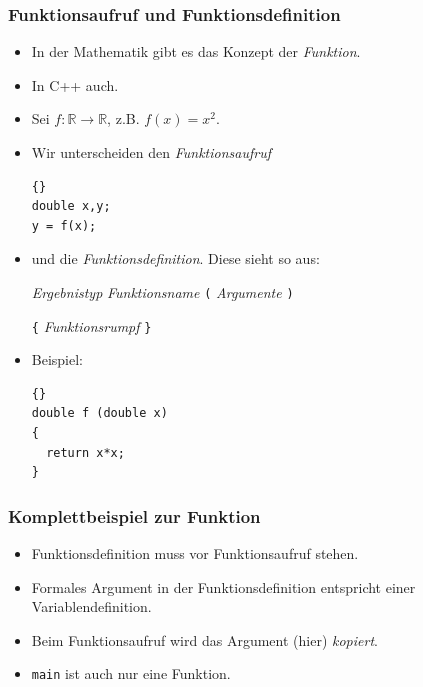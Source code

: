 \begin{frame}[fragile]
\frametitle{Funktionsaufruf und Funktionsdefinition}
\begin{itemize}
\item In der Mathematik gibt es das Konzept der \textsl{Funktion}.
\item In C++ auch.
\item Sei $f : \mathbb{R} \to \mathbb{R}$, z.B. $f(x) = x^2$.
\item Wir unterscheiden den \textsl{Funktionsaufruf}
{\scriptsize\begin{lstlisting}{}
double x,y;
y = f(x);
\end{lstlisting}}
\item und die \textsl{Funktionsdefinition}. Diese sieht so aus:

\medskip
\textsl{Ergebnistyp} \textsl{Funktionsname} \lstinline{(} \textsl{Argumente} \lstinline{)}

\lstinline!{! \textsl{Funktionsrumpf} \lstinline!}!

\medskip
\item Beispiel:
{\scriptsize\begin{lstlisting}{}
double f (double x)
{
  return x*x;
}
\end{lstlisting}}
\end{itemize}
\end{frame}

\begin{frame}[fragile]
\frametitle{Komplettbeispiel zur Funktion}

\begin{itemize}
\item Funktionsdefinition muss vor Funktionsaufruf stehen.
\item Formales Argument in der Funktionsdefinition entspricht einer Variablendefinition.
\item Beim Funktionsaufruf wird das Argument (hier) \textsl{kopiert}.
\item \lstinline{main} ist auch nur eine Funktion.
\end{itemize}
\end{frame}

